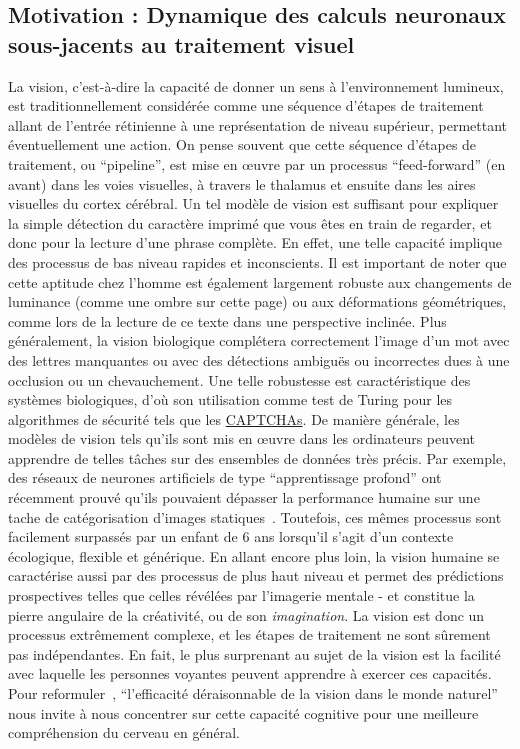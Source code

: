 \subsection{Motivation : Dynamique des calculs neuronaux
sous-jacents au traitement
visuel}
La vision, c'est-à-dire la capacité de donner un sens à l'environnement
lumineux, est traditionnellement considérée comme une séquence d'étapes
de traitement allant de l'entrée rétinienne à une représentation de
niveau supérieur, permettant éventuellement une action. On pense souvent que cette séquence d'étapes de
traitement, ou ``pipeline'', est mise en œuvre par un
processus ``feed-forward'' (en avant) dans les voies visuelles, à travers le thalamus
et ensuite dans les aires visuelles du cortex cérébral. Un tel modèle de
vision est suffisant pour expliquer la simple détection du caractère
imprimé que vous êtes en train de regarder, et donc pour la lecture
d'une phrase complète. En effet, une telle capacité implique des
processus de bas niveau rapides et inconscients. Il est important de
noter que cette aptitude chez l'homme est également largement robuste
aux changements de luminance (comme une ombre sur cette page) ou
aux déformations géométriques, comme lors de la lecture de ce
texte dans une perspective inclinée. Plus généralement, la vision biologique
complétera correctement l'image d'un mot avec des lettres manquantes ou
avec des détections ambiguës ou incorrectes dues à une occlusion ou un
chevauchement. Une telle robustesse est caractéristique des systèmes
biologiques, d'où son utilisation comme test de Turing pour les
algorithmes de sécurité tels que les
\href{https://fr.m.wikipedia.org/wiki/CAPTCHA}{CAPTCHAs}.
De manière générale, les modèles de vision tels qu'ils sont mis en œuvre dans les ordinateurs
peuvent apprendre de telles tâches sur des
ensembles de données très précis.
Par exemple, des réseaux de neurones artificiels de type ``apprentissage profond'' ont récemment prouvé qu'ils pouvaient dépasser la performance humaine sur une tache de catégorisation d'images statiques~\citep{NIPS2012_4824}. %
Toutefois, ces mêmes processus sont facilement surpassés par un
enfant de 6 ans lorsqu'il s'agit d'un contexte écologique, flexible et
générique. En allant encore plus loin, la vision humaine se caractérise
aussi par des processus de plus haut niveau et permet des prédictions
prospectives telles que celles révélées par l'imagerie mentale - et
constitue la pierre angulaire de la créativité, ou de
son \emph{imagination}. La vision est donc un processus
extrêmement complexe, et les étapes de traitement ne sont sûrement pas indépendantes. %
En fait, le plus surprenant au sujet de la vision est la
facilité avec laquelle les personnes voyantes peuvent apprendre à exercer ces
capacités. Pour reformuler~\citet{Wigner90}, ``l'efficacité déraisonnable de
la vision dans le monde naturel'' nous invite à nous concentrer sur cette
capacité cognitive pour une meilleure compréhension du cerveau en
général.

